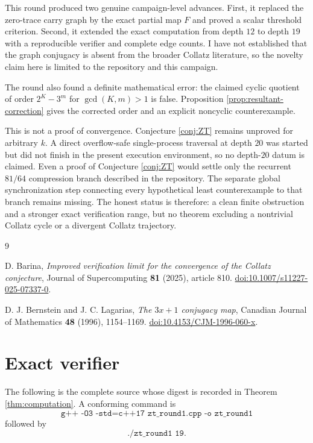 \documentclass[11pt]{article}
\theoremstyle{definition}
\theoremstyle{remark}
\begin{document}
This round produced two genuine campaign-level advances. First, it replaced the zero-trace carry graph by the exact partial map $F$ and proved a scalar threshold criterion. Second, it extended the exact computation from depth $12$ to depth $19$ with a reproducible verifier and complete edge counts. I have not established that the graph conjugacy is absent from the broader Collatz literature, so the novelty claim here is limited to the repository and this campaign.

The round also found a definite mathematical error: the claimed cyclic quotient of order $2^K-3^m$ for $\gcd(K,m)>1$ is false. Proposition \ref{prop:resultant-correction} gives the corrected order and an explicit noncyclic counterexample.

This is not a proof of convergence. Conjecture \ref{conj:ZT} remains unproved for arbitrary $k$. A direct overflow-safe single-process traversal at depth $20$ was started but did not finish in the present execution environment, so no depth-$20$ datum is claimed. Even a proof of Conjecture \ref{conj:ZT} would settle only the recurrent $81/64$ compression branch described in the repository. The separate global synchronization step connecting every hypothetical least counterexample to that branch remains missing. The honest status is therefore: a clean finite obstruction and a stronger exact verification range, but no theorem excluding a nontrivial Collatz cycle or a divergent Collatz trajectory.

\begin{thebibliography}{9}

D. Barina,
\emph{Improved verification limit for the convergence of the Collatz conjecture},
Journal of Supercomputing \textbf{81} (2025), article 810.
\href{https://doi.org/10.1007/s11227-025-07337-0}{doi:10.1007/s11227-025-07337-0}.

D. J. Bernstein and J. C. Lagarias,
\emph{The $3x+1$ conjugacy map},
Canadian Journal of Mathematics \textbf{48} (1996), 1154--1169.
\href{https://doi.org/10.4153/CJM-1996-060-x}{doi:10.4153/CJM-1996-060-x}.

\end{thebibliography}

\appendix
\section{Exact verifier}
\label{app:code}

The following is the complete source whose digest is recorded in Theorem \ref{thm:computation}. A conforming command is
\[
\texttt{g++ -O3 -std=c++17 zt\_round1.cpp -o zt\_round1}
\]
followed by
\[
\texttt{./zt\_round1 19}.
\]
\end{document}

